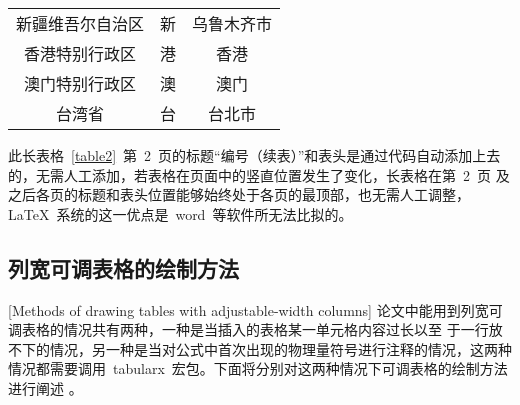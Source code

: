 \begin{longtable}{ccc}
	新疆维吾尔自治区    & 新   & 乌鲁木齐市                                                                                                                                \\
	香港特别行政区     & 港   & 香港                                                                                                                                   \\
	澳门特别行政区     & 澳   & 澳门                                                                                                                                   \\
	台湾省         & 台   & 台北市                                                                                                                                  \\
\end{longtable}\normalsize
\vspace{-1em}

此长表格~\ref{table2}~第~2~页的标题“编号（续表）”和表头是通过代码自动添加上去的，无需人工添加，若表格在页面中的竖直位置发生了变化，长表格在第~2~页
及之后各页的标题和表头位置能够始终处于各页的最顶部，也无需人工调整，\LaTeX~系统的这一优点是~word~等软件所无法比拟的。

\subsection{列宽可调表格的绘制方法}[Methods of drawing tables with adjustable-width columns]
论文中能用到列宽可调表格的情况共有两种，一种是当插入的表格某一单元格内容过长以至
于一行放不下的情况，另一种是当对公式中首次出现的物理量符号进行注释的情况，这两种
情况都需要调用~tabularx~宏包。下面将分别对这两种情况下可调表格的绘制方法进行阐述
。
